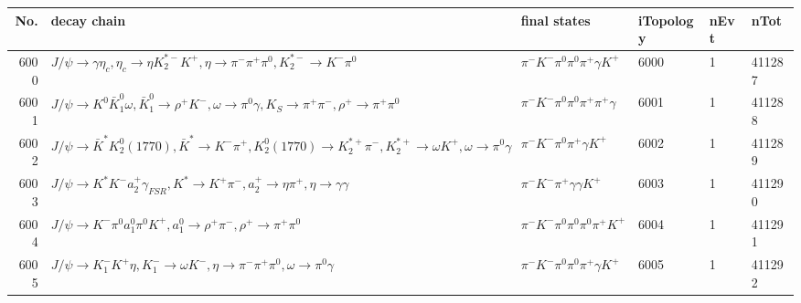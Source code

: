 \begin{table}[htbp] 
\begin{center}
\begin{small}
\begin{tabular}{rlllll}\hline\hline
 No. & decay chain & final states &  iTopology & nEvt & nTot \\\hline
6000&$J/\psi       \rightarrow \gamma       \eta_{c}    , \eta_{c}     \rightarrow \eta          K_2^{*-}       K^{+}          , \eta           \rightarrow \pi^{-}        \pi^{+}        \pi^{0}        , K_2^{*-}        \rightarrow K^{-}          \pi^{0}        $&$\pi^{-}        K^{-}          \pi^{0}        \pi^{0}        \pi^{+}        \gamma       K^{+}          $& 6000&    1&411287\\
6001&$J/\psi       \rightarrow K^{0}          \bar{K}_1^{0} \omega         , \bar{K}_1^{0}  \rightarrow \rho^{+}      K^{-}          , \omega          \rightarrow \pi^{0}        \gamma       , K_{S}           \rightarrow \pi^{+}        \pi^{-}        , \rho^{+}       \rightarrow \pi^{+}        \pi^{0}        $&$\pi^{-}        K^{-}          \pi^{0}        \pi^{0}        \pi^{+}        \pi^{+}        \gamma       $& 6001&    1&411288\\
6002&$J/\psi       \rightarrow \bar{K}^{*}   K_2^0(1770)    , \bar{K}^{*}    \rightarrow K^{-}          \pi^{+}        , K_2^0(1770)     \rightarrow K_2^{*+}       \pi^{-}        , K_2^{*+}        \rightarrow \omega         K^{+}          , \omega          \rightarrow \pi^{0}        \gamma       $&$\pi^{-}        K^{-}          \pi^{0}        \pi^{+}        \gamma       K^{+}          $& 6002&    1&411289\\
6003&$J/\psi       \rightarrow K^{*}          K^{-}          a_{2}^{+}      \gamma_{FSR} , K^{*}           \rightarrow K^{+}          \pi^{-}        , a_{2}^{+}       \rightarrow \eta          \pi^{+}        , \eta           \rightarrow \gamma       \gamma       $&$\pi^{-}        K^{-}          \pi^{+}        \gamma       \gamma       K^{+}          $& 6003&    1&411290\\
6004&$J/\psi       \rightarrow K^{-}          \pi^{0}        a_{1}^{0}      \pi^{0}        K^{+}          , a_{1}^{0}       \rightarrow \rho^{+}      \pi^{-}        , \rho^{+}       \rightarrow \pi^{+}        \pi^{0}        $&$\pi^{-}        K^{-}          \pi^{0}        \pi^{0}        \pi^{0}        \pi^{+}        K^{+}          $& 6004&    1&411291\\
6005&$J/\psi       \rightarrow K_{1}^{-}      K^{+}          \eta          , K_{1}^{-}       \rightarrow \omega         K^{-}          , \eta           \rightarrow \pi^{-}        \pi^{+}        \pi^{0}        , \omega          \rightarrow \pi^{0}        \gamma       $&$\pi^{-}        K^{-}          \pi^{0}        \pi^{0}        \pi^{+}        \gamma       K^{+}          $& 6005&    1&411292\\

\end{tabular}
\end{small}
\end{center}
\end{table}
